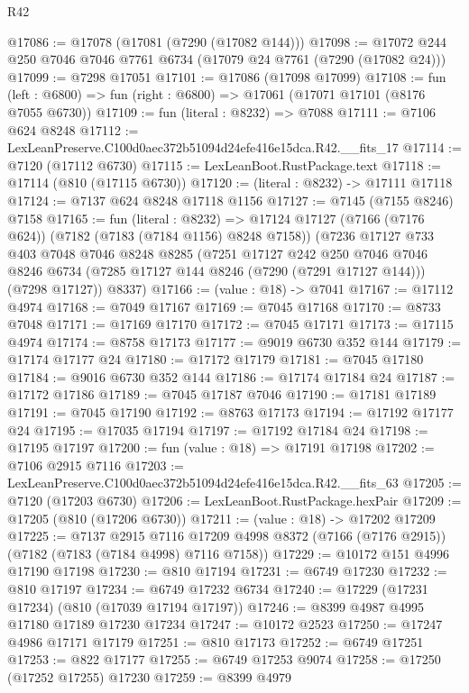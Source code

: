\begin{lexlean}{R42}
\begin{coremodule}
{@17086 := @17078 (@17081 (@7290 (@17082 @144)))
@17098 := @17072 @244 @250 @7046 @7046 @7761 @6734 (@17079 @24 @7761 (@7290 (@17082 @24)))
@17099 := @7298 @17051
@17101 := @17086 (@17098 @17099)
@17108 := fun (left : @6800) => fun (right : @6800) => @17061 (@17071 @17101 (@8176 @7055 @6730))
@17109 := fun (literal : @8232) => @7088
@17111 := @7106 @624 @8248
@17112 := LexLeanPreserve.C100d0aec372b51094d24efe416e15dca.R42.__fits_17
@17114 := @7120 (@17112 @6730)
@17115 := LexLeanBoot.RustPackage.text
@17118 := @17114 (@810 (@17115 @6730))
@17120 := (literal : @8232) -> @17111 @17118
@17124 := @7137 @624 @8248 @17118 @1156
@17127 := @7145 (@7155 @8246) @7158
@17165 := fun (literal : @8232) =>
  @17124
    @17127
    (@7166 (@7176 @624))
    (@7182 (@7183 (@7184 @1156) @8248 @7158))
    (@7236
      @17127
      @733
      @403
      @7048
      @7046
      @8248
      @8285
      (@7251
        @17127
        @242
        @250
        @7046
        @7046
        @8246
        @6734
        (@7285 @17127 @144 @8246 (@7290 (@7291 @17127 @144)))
        (@7298 @17127))
      @8337)
@17166 := (value : @18) -> @7041
@17167 := @17112 @4974
@17168 := @7049 @17167
@17169 := @7045 @17168
@17170 := @8733 @7048
@17171 := @17169 @17170
@17172 := @7045 @17171
@17173 := @17115 @4974
@17174 := @8758 @17173
@17177 := @9019 @6730 @352 @144
@17179 := @17174 @17177 @24
@17180 := @17172 @17179
@17181 := @7045 @17180
@17184 := @9016 @6730 @352 @144
@17186 := @17174 @17184 @24
@17187 := @17172 @17186
@17189 := @7045 @17187 @7046
@17190 := @17181 @17189
@17191 := @7045 @17190
@17192 := @8763 @17173
@17194 := @17192 @17177 @24
@17195 := @17035 @17194
@17197 := @17192 @17184 @24
@17198 := @17195 @17197
@17200 := fun (value : @18) => @17191 @17198
@17202 := @7106 @2915 @7116
@17203 := LexLeanPreserve.C100d0aec372b51094d24efe416e15dca.R42.__fits_63
@17205 := @7120 (@17203 @6730)
@17206 := LexLeanBoot.RustPackage.hexPair
@17209 := @17205 (@810 (@17206 @6730))
@17211 := (value : @18) -> @17202 @17209
@17225 := @7137
    @2915
    @7116
    @17209
    @4998
    @8372
    (@7166 (@7176 @2915))
    (@7182 (@7183 (@7184 @4998) @7116 @7158))
@17229 := @10172 @151 @4996 @17190 @17198
@17230 := @810 @17194
@17231 := @6749 @17230
@17232 := @810 @17197
@17234 := @6749 @17232 @6734
@17240 := @17229 (@17231 @17234) (@810 (@17039 @17194 @17197))
@17246 := @8399 @4987 @4995 @17180 @17189 @17230 @17234
@17247 := @10172 @2523
@17250 := @17247 @4986 @17171 @17179
@17251 := @810 @17173
@17252 := @6749 @17251
@17253 := @822 @17177
@17255 := @6749 @17253 @9074
@17258 := @17250 (@17252 @17255) @17230
@17259 := @8399 @4979
}
\end{coremodule}
\end{lexlean}

